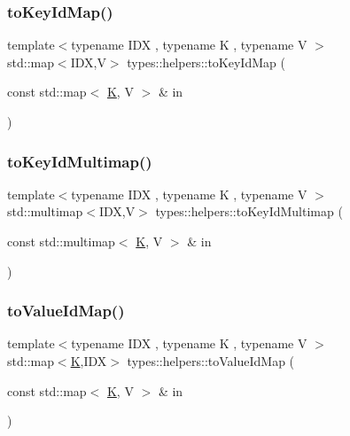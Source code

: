\mbox{\label{namespacetypes_1_1helpers_a0d9d21d9a620d7b61b1c1d2e4e84739b}} 
\subsubsection{\texorpdfstring{toKeyIdMap()}{toKeyIdMap()}}
{\footnotesize\ttfamily template$<$typename I\+DX , typename K , typename V $>$ \\
std\+::map$<$I\+DX,V$>$ types\+::helpers\+::to\+Key\+Id\+Map (\begin{DoxyParamCaption}\item[{const std\+::map$<$ \mbox{\hyperlink{graphbuilder__shp_8cpp_a891e241aa245ae63618f03737efba309}{K}}, V $>$ \&}]{in }\end{DoxyParamCaption})}

\mbox{\label{namespacetypes_1_1helpers_a1e0cfb6c1325b9c0dae5864153fca9b4}} 
\subsubsection{\texorpdfstring{toKeyIdMultimap()}{toKeyIdMultimap()}}
{\footnotesize\ttfamily template$<$typename I\+DX , typename K , typename V $>$ \\
std\+::multimap$<$I\+DX,V$>$ types\+::helpers\+::to\+Key\+Id\+Multimap (\begin{DoxyParamCaption}\item[{const std\+::multimap$<$ \mbox{\hyperlink{graphbuilder__shp_8cpp_a891e241aa245ae63618f03737efba309}{K}}, V $>$ \&}]{in }\end{DoxyParamCaption})}

\mbox{\label{namespacetypes_1_1helpers_a3e4e38a159fe552527d7bfebadb05b4d}} 
\subsubsection{\texorpdfstring{toValueIdMap()}{toValueIdMap()}}
{\footnotesize\ttfamily template$<$typename I\+DX , typename K , typename V $>$ \\
std\+::map$<$\mbox{\hyperlink{graphbuilder__shp_8cpp_a891e241aa245ae63618f03737efba309}{K}},I\+DX$>$ types\+::helpers\+::to\+Value\+Id\+Map (\begin{DoxyParamCaption}\item[{const std\+::map$<$ \mbox{\hyperlink{graphbuilder__shp_8cpp_a891e241aa245ae63618f03737efba309}{K}}, V $>$ \&}]{in }\end{DoxyParamCaption})}

